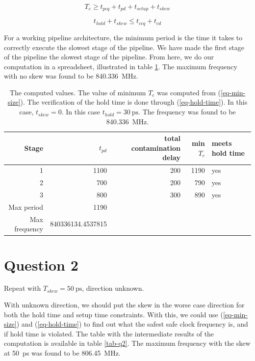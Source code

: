 \documentclass[hidelinks, 12pt]{article}
\begin{document}
\begin{equation}
\label{eq-min-size}
T_c \geq t_{pcq} + t_{pd} + t_{setup} + t_{skew}
\end{equation}

\begin{equation}
\label{eq-hold-time}
t_{hold} + t_{skew} \leq t_{ccq} + t_{cd}
\end{equation}

For a working pipeline architecture, the minimum period is the time it takes to correctly execute the slowest stage of the pipeline.
We have made the first stage of the pipeline the slowest stage of the pipeline.
From here, we do our computation in a spreadsheet, illustrated in table \ref{tab-q1}.
The maximum frequency with no skew was found to be \qty{840.336}{\mega\hertz}.

\begin{table}[htbp]
\caption{\label{tab-q1}The computed values. The value of minimum \(T_{c}\) was computed from (\ref{eq-min-size}). The verification of the hold time is done through (\ref{eq-hold-time}). In this case, \(t_{skew}=0\). In this case \(t_{hold} = \qty{30}{\pico\s}\). The frequency was found to be \qty{840.336}{\mega\hertz}.}
\centering
\begin{tabular}{rrrrl}
Stage & \(t_{pd}\) & total contamination delay & min \(T_{c}\) & meets hold time\\
\hline
1 & 1100 & 200 & 1190 & yes\\
2 & 700 & 200 & 790 & yes\\
3 & 800 & 300 & 890 & yes\\
\hline
Max period & 1190 &  &  & \\
Max frequency & 840336134.4537815 &  &  & \\
\end{tabular}
\end{table}
\section*{Question 2}
\label{sec:orgb284642}
Repeat with \(T_{skew} = \qty{50}{\pico\s}\), direction unknown.

With unknown direction, we should put the skew in the worse case direction for both the hold time and setup time constraints.
With this, we could use (\ref{eq-min-size}) and (\ref{eq-hold-time}) to find out what the safest safe clock frequency is, and if hold time is violated.
The table with the intermediate results of the computation is available in table \ref{tab-q2}.
The maximum frequency with the skew at \qty{50}{\pico\s} was found to be \qty{806.45}{\mega\hertz}.
\end{document}
